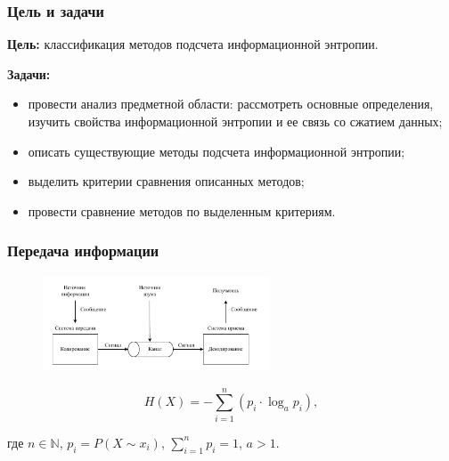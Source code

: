 \documentclass{bmstu-pr}
\begin{document}

\begin{frame}
    \frametitle{Цель и задачи}

    \textbf{Цель:} классификация методов подсчета информационной энтропии.

    \textbf{Задачи:}
    \begin{itemize}
		\item провести анализ предметной области: рассмотреть основные определения, изучить свойства информационной энтропии и ее связь со сжатием данных;
		\item описать существующие методы подсчета информационной энтропии;
		\item выделить критерии сравнения описанных методов;
		\item провести сравнение методов по выделенным критериям.
    \end{itemize}
\end{frame}

\begin{frame}
    \frametitle{Передача информации}
    
	\begin{figure}[h]
    		\centering
    		\includegraphics[width=0.6\textwidth]{img/transmission.pdf}
	\end{figure}
	
	\begin{equation}
		H(X) = -\sum_{i = 1}^n (p_{i} \cdot \log_{a}p_{i}),
	\end{equation}
	
	где $n \in \mathbb{N}$, $p_{i} = P(X \sim x_{i})$, $\sum_{i = 1}^n p_{i} = 1$, $a > 1$.

\end{frame}
\end{document}
